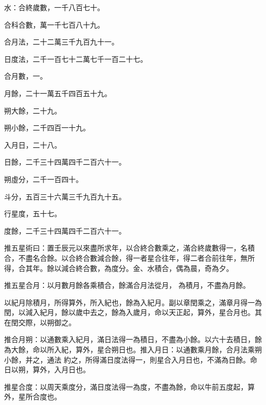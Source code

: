 \begin{pinyinscope}
 水：合終歲數，一千八百七十。



 合科合數，萬一千七百八十九。



 合月法，二十二萬三千九百九十一。



 日度法，二千一百七十二萬七千一百二十七。



 合月數，一。



 月餘，二十一萬五千四百五十九。



 朔大餘，二十九。



 朔小餘，二千四百一十九。



 入月日，二十八。



 日餘，二千三十四萬四千二百六十一。



 朔虛分，二千一百四十。



 斗分，五百三十六萬三千九百九十五。



 行星度，五十七。



 度餘，二千三十四萬四千二百六十一。



 推五星術曰：置壬辰元以來盡所求年，以合終合數乘之，滿合終歲數得一，名積合，不盡名合餘。以合終合數減合餘，得一者星合往年，得二者合前往年，無所得，合其年。餘以減合終合數，為度分。金、水積合，偶為晨，奇為夕。



 推五星合月：以月數月餘各乘積合，餘滿合月法從月，
 為積月，不盡為月餘。



 以紀月除積月，所得算外，所入紀也，餘為入紀月。副以章閏乘之，滿章月得一為閏，以減入紀月，餘以歲中去之，餘為入歲月，命以天正起，算外，星合月也。其在閏交際，以朔御之。



 推合月朔：以通數乘入紀月，滿日法得一為積日，不盡為小餘。以六十去積日，餘為大餘，命以所入紀，算外，星合朔日也。推入月日：以通數乘月餘，合月法乘朔小餘，并之，通法
 約之，所得滿日度法得一，則星合入月日也，不滿為日餘。命日以朔，算外，入月日也。



 推星合度：以周天乘度分，滿日度法得一為度，不盡為餘，命以牛前五度起，算外，星所合度也。




\end{pinyinscope}
